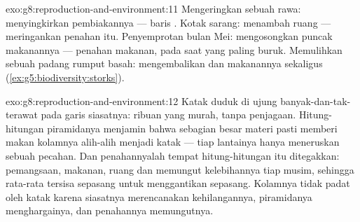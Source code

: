 \begin{solution}{exo:g8:reproduction-and-environment:11}
Mengeringkan sebuah rawa: menyingkirkan  pembiakannya --- baris
. Kotak sarang: menambah ruang --- meringankan penahan itu.
Penyemprotan bulan Mei: mengosongkan puncak makanannya --- penahan
makanan, pada saat yang paling buruk. Memulihkan sebuah padang rumput
basah: mengembalikan  dan makanannya sekaligus
(\cref{ex:g5:biodiversity:storks}).
\end{solution}

\begin{solution}{exo:g8:reproduction-and-environment:12}
Katak duduk di ujung banyak-dan-tak-terawat pada garis siasatnya:
ribuan  yang murah, tanpa penjagaan. Hitung-hitungan piramidanya
menjamin bahwa sebagian besar materi  pasti memberi makan
 kolamnya alih-alih menjadi katak --- tiap lantainya hanya
meneruskan sebuah pecahan. Dan penahannyalah tempat hitung-hitungan itu
ditegakkan: pemangsaan, makanan, ruang dan  memungut
kelebihannya tiap musim, sehingga rata-rata tersisa sepasang untuk
menggantikan sepasang. Kolamnya tidak padat oleh katak karena
siasatnya merencanakan kehilangannya, piramidanya menghargainya, dan
penahannya memungutnya.
\end{solution}

